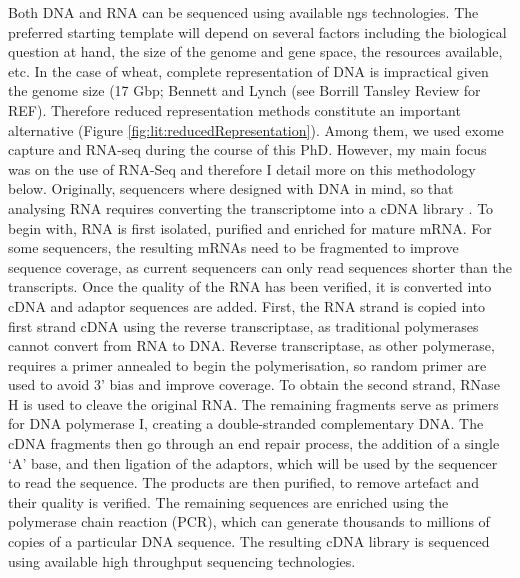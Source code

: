 Both DNA and RNA can be sequenced using available \gls{ngs} technologies. 
The preferred starting template will depend on several factors including the biological question at hand, the size of the genome and gene space, the resources available, etc. 
In the case of wheat, complete representation of DNA is impractical given the genome size (17 Gbp; Bennett and Lynch (see Borrill Tansley Review for REF). 
Therefore reduced representation methods constitute an important alternative (Figure \ref{fig:lit:reducedRepresentation}). 
Among them, we used exome capture and RNA-seq during the course of this PhD. However, my main focus was on the use of RNA-Seq and therefore I detail more on this methodology below. 
Originally, sequencers where designed with DNA in mind, so that analysing RNA requires converting the transcriptome into a cDNA library \cite{RNAseqlopedia, truseq}.
To begin with, RNA is first isolated, purified and enriched for mature mRNA.  
For some sequencers, the resulting mRNAs need to be fragmented to improve sequence coverage, as current sequencers can only read sequences shorter than the transcripts. 
Once the quality of the RNA has been verified, it is converted into cDNA and adaptor sequences are added. 
First, the RNA strand is copied into first strand cDNA using the reverse transcriptase, as traditional polymerases cannot convert from RNA to DNA\cite{alberts2014molecular}.
Reverse transcriptase, as other polymerase, requires a primer annealed to begin the polymerisation, so random primer are used to avoid 3' bias and improve coverage\cite{RNAseqlopedia, truseq}.
To obtain the second strand, RNase H is used to cleave the original RNA. 
The remaining fragments serve as primers for DNA polymerase I, creating a double-stranded complementary DNA. 
The cDNA fragments then go through an end repair process, the addition of a single ‘A’ base, and then ligation of the adaptors, which will be used by the sequencer to read the sequence. 
The products are then purified, to remove artefact and their quality is verified\cite{RNAseqlopedia, truseq}.
The remaining sequences are enriched using the polymerase chain reaction (PCR),  which can generate thousands to millions of copies of a particular DNA sequence\cite{RNAseqlopedia, truseq}.
The resulting cDNA library is sequenced using available high throughput sequencing technologies. 


